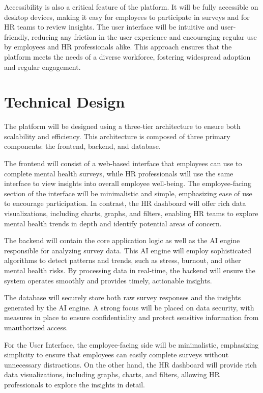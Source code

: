 \documentclass[conference]{IEEEtran}
\begin{document}
Accessibility is also a critical feature of the platform. It
will be fully accessible on desktop devices, making it easy for
employees to participate in surveys and for HR teams to
review insights. The user interface will be intuitive and user-
friendly, reducing any friction in the user experience and
encouraging regular use by employees and HR professionals
alike. This approach ensures that the platform meets the needs
of a diverse workforce, fostering widespread adoption and
regular engagement.

\section{Technical Design}
The platform will be designed using a three-tier
architecture to ensure both scalability and efficiency. This
architecture is composed of three primary components: the
frontend, backend, and database.\newline

The frontend will consist of a web-based interface that
employees can use to complete mental health surveys, while
HR professionals will use the same interface to view insights
into overall employee well-being. The employee-facing
section of the interface will be minimalistic and simple,
emphasizing ease of use to encourage participation. In
contrast, the HR dashboard will offer rich data visualizations,
including charts, graphs, and filters, enabling HR teams to
explore mental health trends in depth and identify potential
areas of concern.\newline

The backend will contain the core application logic as well
as the AI engine responsible for analyzing survey data. This
AI engine will employ sophisticated algorithms to detect
patterns and trends, such as stress, burnout, and other mental
health risks. By processing data in real-time, the backend will
ensure the system operates smoothly and provides timely,
actionable insights.\newline

The database will securely store both raw survey responses
and the insights generated by the AI engine. A strong focus
will be placed on data security, with measures in place to
ensure confidentiality and protect sensitive information from
unauthorized access.\newline

For the User Interface, the employee-facing side will be
minimalistic, emphasizing simplicity to ensure that employees
can easily complete surveys without unnecessary distractions.
On the other hand, the HR dashboard will provide rich data
visualizations, including graphs, charts, and filters, allowing
HR professionals to explore the insights in detail.
\newline
\end{document}
